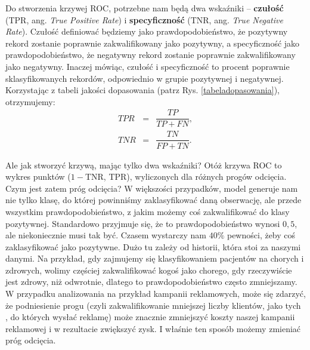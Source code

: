 \documentclass{mini}
\begin{document}
\vfill
\clearpage

Do stworzenia krzywej ROC, potrzebne nam będą dwa wskaźniki -- \textbf{czułość} (TPR, ang. \textit{True Positive Rate}) i \textbf{specyficzność} (TNR, ang. \textit{True Negative Rate}). Czułość definiować będziemy jako prawdopodobieństwo, że pozytywny rekord zostanie poprawnie zakwalifikowany jako pozytywny, a specyficzność jako prawdopodobieństwo, że negatywny rekord zostanie poprawnie zakwalifikowany jako negatywny. Inaczej mówiąc, czułość i specyficzność to procent poprawnie sklasyfikowanych rekordów, odpowiednio w grupie pozytywnej i negatywnej. Korzystając z tabeli jakości dopasowania (patrz Rys. \ref{tabeladopasowania}), otrzymujemy:
\begin{eqnarray*}
	TPR&=&\dfrac{TP}{TP+FN},\\
	TNR&=&\dfrac{TN}{FP+TN}.		
\end{eqnarray*}  

Ale jak stworzyć krzywą, mając tylko dwa wskaźniki? Otóż krzywa ROC to wykres punktów ($1-$TNR, TPR), wyliczonych dla różnych progów odcięcia. Czym jest zatem próg odcięcia? W większości przypadków, model generuje nam nie tylko klasę, do której powinniśmy zaklasyfikować daną obserwację, ale przede wszystkim prawdopodobieństwo, z jakim możemy coś zakwalifikować do klasy pozytywnej. Standardowo przyjmuje się, że to prawdopodobieństwo wynosi $0,5$, ale niekoniecznie musi tak być. Czasem wystarczy nam $40\%$ pewności, żeby coś zaklasyfikować jako pozytywne. Dużo tu zależy od historii, która stoi za naszymi danymi. Na przykład, gdy zajmujemy się klasyfikowaniem pacjentów na chorych i zdrowych, wolimy częściej zakwalifikować kogoś jako chorego, gdy rzeczywiście jest zdrowy, niż odwrotnie, dlatego to prawdopodobieństwo często zmniejszamy. W przypadku analizowania na przykład kampanii reklamowych, może się zdarzyć, że podniesienie progu (czyli zakwalifikowanie mniejszej liczby klientów, jako tych , do których wysłać reklamę) może znacznie zmniejszyć koszty naszej kampanii reklamowej i w rezultacie zwiększyć zysk. I właśnie ten sposób możemy zmieniać próg odcięcia. 
\end{document}
